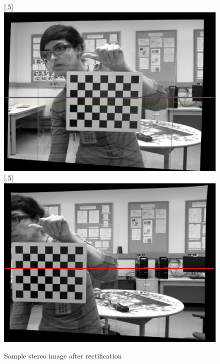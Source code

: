 \begin{figure}[h!]
\centering
{}
[.5\linewidth]{\includegraphics[scale=0.35]{rectLmark}}%
[.5\linewidth]{\includegraphics[scale=0.35]{rectRmark}}%
\caption{Sample stereo image after rectification}
\label{fig:rect}
\end{figure}

